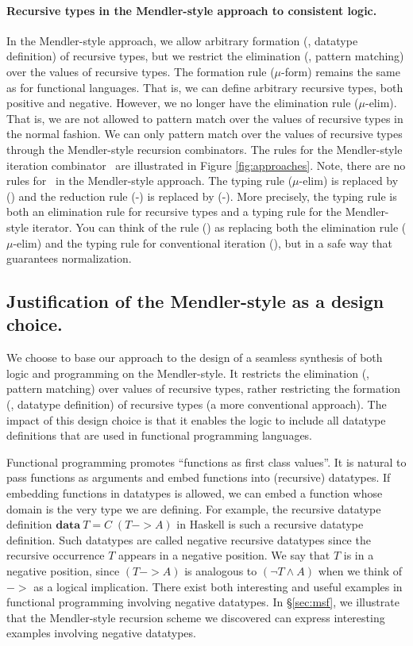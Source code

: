 \paragraph{Recursive types in the Mendler-style approach to consistent logic.}
In the Mendler-style approach, we allow arbitrary formation
(\ie, datatype definition) of recursive types, but we restrict
the elimination (\ie, pattern matching) over the values of recursive types. 
The formation rule {\small($\mu$-form)} remains the same as
for functional languages. That is, we can define arbitrary recursive types,
both positive and negative. However, we no longer have the elimination
rule {\small($\mu$-elim)}. That is, we are not allowed to pattern match over
the values of recursive types in the normal fashion. We can only pattern match
over the values of recursive types through the Mendler-style recursion
combinators. The rules for the Mendler-style iteration combinator \MIt\
are illustrated in Figure \ref{fig:approaches}.
Note, there are no rules for \unIn\ in the Mendler-style approach.
The typing rule {\small($\mu$-elim)} is replaced by {\small(\MIt)} and
the reduction rule {\small(\unIn-\In)} is replaced by {\small(\MIt-\In)}.
More precisely, the typing rule {\small \MIt} is both an elimination rule
for recursive types and a typing rule for the Mendler-style iterator.
You can think of the rule {\small(\MIt)} as replacing both the elimination rule
{\small($\mu$-elim)} and the typing rule for conventional iteration
{\small(\It)}, but in a safe way that guarantees normalization.

\subsection{Justification of the Mendler-style as a design choice.}
\label{sec:intro:concepts:mendler}
We choose to base our approach to the design of a seamless synthesis of both
logic and programming on the Mendler-style. It restricts the elimination (\ie,
pattern matching) over values of recursive types, rather restricting the
formation (\ie, datatype definition) of recursive types (a more conventional
approach). The impact of this design choice is that it enables the logic to
include all datatype definitions that are used in functional programming
languages.

Functional programming promotes ``functions as first class values''.
It is natural to pass functions as arguments and embed functions into
(recursive) datatypes. If embedding functions in datatypes is allowed,
we can embed a function whose domain is the very type we are defining.
For example, the recursive datatype definition
$\mathbf{data}~T = C\;(T -> \textit{A})$ in Haskell is such a recursive
datatype definition. Such datatypes are called negative recursive datatypes
since the recursive occurrence $T$ appears in a negative position.
We say that $T$ is in a negative position, since $(T -> A)$ is analogous to
$(\neg T \land A)$ when we think of $->$ as a logical implication. There exist
both interesting and useful examples in functional programming involving
negative datatypes. In \S\ref{sec:msf}, we illustrate that
the Mendler-style recursion scheme we discovered can express
interesting examples involving negative datatypes.

